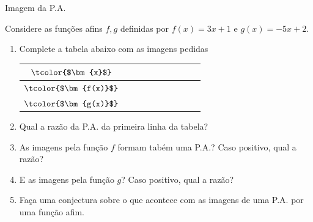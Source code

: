 \begin{task}{Imagem da P.A.}

Considere as funções afins $f,g$ definidas por $f(x)=3x+1$ e $g(x)=-5x+2$.
\begin{enumerate}
\item Complete a tabela abaixo com as imagens pedidas

\begin{table}[H]
\centering
\begin{tabu} to 
\hline
{} & & & & & & & & & \\
\hline
{} & & & & & & & & & \\
\hline
{} & & & & & & & & & \\
\hline
\end{tabu}
\end{table}
\item Qual a razão da P.A. da primeira linha da tabela?
\item As imagens pela função $f$ formam tabém uma P.A.? Caso positivo, qual a razão?
\item E as imagens pela função $g$? Caso positivo, qual a razão?
\item Faça uma conjectura sobre o que acontece com as imagens de uma P.A. por uma função afim.
\end{enumerate}
\end{task}

